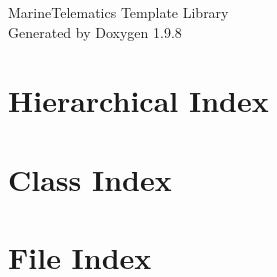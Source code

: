 \documentclass[twoside]{book}
\newcommand{\+}{\discretionary{\mbox{\scriptsize$\hookleftarrow$}}{}{}}
\newcommand{\clearemptydoublepage}{%
    \newpage{\pagestyle{empty}\cleardoublepage}%
  }
\begin{document}
  \raggedbottom
    \hypersetup{pageanchor=false,
                bookmarksnumbered=true,
                pdfencoding=unicode
               }
  \begin{titlepage}
  \vspace*{7cm}
  \begin{center}%
  {\Large Marine\+Telematics Template Library}\\
  \vspace*{1cm}
  {\large Generated by Doxygen 1.9.8}\\
  \end{center}
  \end{titlepage}
  \clearemptydoublepage
  \tableofcontents
  \clearemptydoublepage
  \hypersetup{pageanchor=true}
\chapter{Hierarchical Index}

\chapter{Class Index}

\chapter{File Index}

\end{document}
